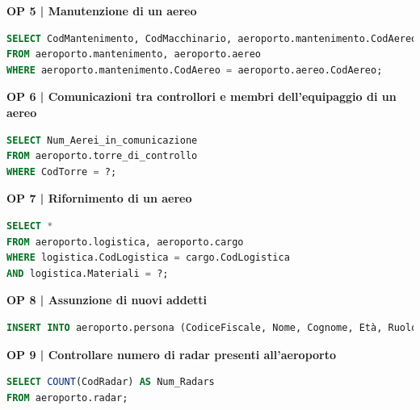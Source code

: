 \textbf{\small OP 5 | Manutenzione di un aereo}\\

\begin{lstlisting}[language=SQL]
SELECT CodMantenimento, CodMacchinario, aeroporto.mantenimento.CodAereo
FROM aeroporto.mantenimento, aeroporto.aereo
WHERE aeroporto.mantenimento.CodAereo = aeroporto.aereo.CodAereo;	
\end{lstlisting}


\textbf{\small OP 6 | Comunicazioni tra controllori e membri dell'equipaggio di un aereo}\\

\begin{lstlisting}[language=SQL]
SELECT Num_Aerei_in_comunicazione
FROM aeroporto.torre_di_controllo
WHERE CodTorre = ?; 	
\end{lstlisting}


\newpage %

\textbf{\small OP 7 | Rifornimento di un aereo}\\

\begin{lstlisting}[language=SQL]
SELECT *
FROM aeroporto.logistica, aeroporto.cargo
WHERE logistica.CodLogistica = cargo.CodLogistica
AND logistica.Materiali = ?;	
\end{lstlisting}


\textbf{\small OP 8 | Assunzione di nuovi addetti}\\

\begin{lstlisting}[language=SQL]
INSERT INTO aeroporto.persona (CodiceFiscale, Nome, Cognome, Età, Ruolo, Ora_inizio, Ora_fine) VALUES (?, ?, ?, ?, ?, ?, ?);
\end{lstlisting}


\textbf{\small OP 9 | Controllare numero di radar presenti all'aeroporto}\\

\begin{lstlisting}[language=SQL]
SELECT COUNT(CodRadar) AS Num_Radars
FROM aeroporto.radar;
\end{lstlisting}


